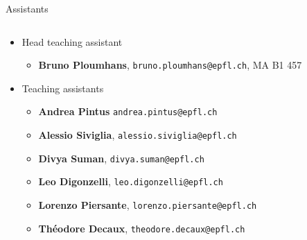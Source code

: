 \begin{frame}{Assistants}
    \begin{columns}
    \begin{column}{1.1\textwidth}
    \begin{itemize}
        \item Head teaching assistant
            \begin{itemize}
                \item \textbf{Bruno Ploumhans}, \texttt{bruno.ploumhans@epfl.ch}, MA B1 457
            \end{itemize}
            \vspace{1.5em}
        \item Teaching assistants
            \begin{itemize}
                    \vspace{0.1em}
                    \item \textbf{Andrea Pintus} \texttt{andrea.pintus@epfl.ch}
                    \vspace{0.1em}
                    \item \textbf{Alessio Siviglia}, \texttt{alessio.siviglia@epfl.ch}
                    \vspace{0.1em}
                    \item \textbf{Divya Suman}, \texttt{divya.suman@epfl.ch}
                    \vspace{0.1em}
                    \item \textbf{Leo Digonzelli}, \texttt{leo.digonzelli@epfl.ch}
                    \vspace{0.1em}
                    \item \textbf{Lorenzo Piersante}, \texttt{lorenzo.piersante@epfl.ch}
                    \vspace{0.1em}
                    \item \textbf{Théodore Decaux}, \texttt{theodore.decaux@epfl.ch}
            \end{itemize}
    \end{itemize}
    \end{column}
    \end{columns}
\end{frame}

